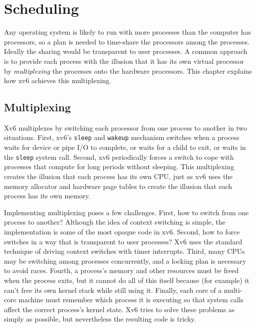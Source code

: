 % 
%  
\chapter{Scheduling}
\label{CH:SCHED}

Any operating system is likely to run with more processes than the
computer has processors, so a plan is needed to time-share the
processors among the processes. Ideally the sharing would be transparent to user
processes.  A common approach is to provide each process
with the illusion that it has its own virtual processor by
\textit{multiplexing}
the processes onto the hardware processors.
This chapter explains how xv6 achieves this multiplexing.
\section{Multiplexing}

Xv6 multiplexes by switching each processor from one process to
another in two situations. First, xv6's
\lstinline{sleep}
and
\lstinline{wakeup}
mechanism switches when a process waits
for device or pipe I/O to complete, or waits for a child
to exit, or waits in the
\lstinline{sleep}
system call.
Second, xv6 periodically forces a switch to cope with
processes that compute for long periods without sleeping.
This multiplexing creates the illusion that
each process has its own CPU, just as xv6 uses the memory allocator and hardware
page tables to create the illusion that each process has its own memory.

Implementing multiplexing poses a few challenges. First, how to switch from one
process to another? 
Although the idea of context switching
is simple, the implementation is some of the most opaque code
in xv6. Second, how to force
switches in a way that is transparent to user processes?  Xv6 uses the
standard technique of driving context switches with timer interrupts.
Third, many CPUs may be switching among processes concurrently, and a
locking plan is necessary to avoid races. Fourth, a process's
memory and other resources must be freed when the process exits,
but it cannot do all of this itself
because (for example) it can't free its own kernel stack while still using it.
Finally, each core of a multi-core machine must remember which
process it is executing so that system calls affect the correct
process's kernel state.
Xv6 tries to solve these problems as
simply as possible, but nevertheless the resulting code is
tricky.

